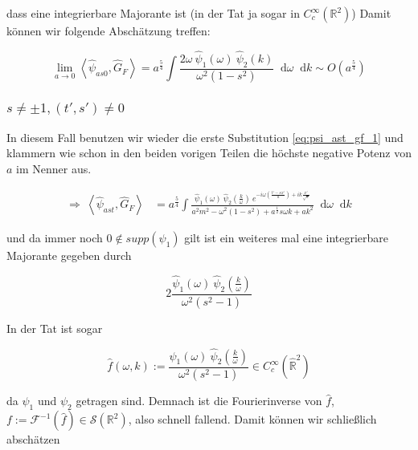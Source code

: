 \documentclass{scrartcl}
\renewcommand*\d{\mathop{}\!\mathrm{d}}
\begin{document}
dass eine integrierbare Majorante ist (in der Tat ja sogar in $C_c^\infty (\mathbb{R}^2)$)
Damit können wir folgende Abschätzung treffen:

\begin{equation*}
    \lim_{a \rightarrow 0} \left< \hat\psi_{as0}, \hat G_F \right> =
    a^\frac{5}{4} \int \frac{2 \omega ~\hat \psi_1(\omega) ~\hat \psi_2(k)}
    {\omega^2 (1-s^2)}
    \d \omega \d k
    \sim O(a^\frac{5}{4})
\end{equation*}


\subsubsection*{$s \neq \pm 1, (t', s') \neq 0$}
In diesem Fall benutzen wir wieder die erste Substitution \eqref{eq:psi_ast_gf_1}
und klammern wie schon in den beiden vorigen Teilen die höchste negative
Potenz von $a$ im Nenner aus.

\begin{align}
\Rightarrow ~
    \left< \hat\psi_{ast}, \hat G_F \right>
    &=
    a^\frac{5}{4} \int \frac{
        \hat \psi_1 (\omega) ~\hat \psi_2 \left(\frac{k}{\omega}\right)
        ~ e^{-i \omega \left(\frac{t'-sx'}{a}\right) + i k \frac{x'}{\sqrt{a}}}
    }
    {
        a^2 m^2 - \omega^2 (1-s^2) + a^\frac{1}{2} s \omega k +a k^2
    }
    \d \omega \d k
\end{align}

und da immer noch $0 \notin supp(\psi_1)$ gilt ist ein weiteres mal eine integrierbare Majorante gegeben durch

\begin{equation}
    2\frac{\hat \psi_1 (\omega)~\hat\psi_2 \left(\frac{k}{\omega}\right)}
    {\omega^2(s^2-1)}
\end{equation}

In der Tat ist sogar

\begin{equation}
    \hat f(\omega, k) := \frac{\hat \psi_1 (\omega)~\hat\psi_2 \left(\frac{k}{\omega}\right)}
    {\omega^2(s^2-1)}
    \in C_c^\infty (\hat{\mathbb{R}}^2)
\end{equation}

da $\psi_1$ und $\psi_2$ getragen sind. Demnach ist die Fourierinverse von
$\hat f$, $f := \mathcal{F}^{-1}(\hat f) \in \mathcal{S}(\mathbb{R}^2)$, also schnell
fallend. Damit können wir schließlich abschätzen
\end{document}
